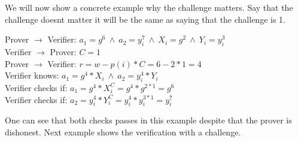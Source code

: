 \noindent
{} We will now show a concrete example why the challenge matters. Say that the challenge doesnt matter it will be the same as saying that the challenge is 1. 

\begin{infobox}
Prover \begin{math}\rightarrow\end{math} Verifier: \begin{math}a_1=g^6 \ \land\ a_2=y_i^7 \ \land \ X_i=g^2 \ \land \ Y_i=y_i^3 \end{math}\\
Verifier \begin{math}\rightarrow\end{math} Prover: \begin{math}C=1 \end{math}\\
Prover \begin{math}\rightarrow\end{math} Verifier: \begin{math}r=w-p(i) * C = 6-2 * 1= 4\end{math}\\
Verifier knows:  \begin{math}a_1=g^4 * X_i \ \land \ a_2=y_i^4 * Y_i \end{math}\\
Verifier checks if:  \begin{math}a_1 = g^4*X_i^C = g^4*g^{2*1} = g^6\end{math}\\
Verifier checks if:  \begin{math} a_2=y_i^4 * Y_i^C = y_i^4 * y_i^{3*1}= y_i^7 \end{math}
\end{infobox}

\noindent
One can see that both checks passes in this example despite that the prover is dishonest. Next example shows the verification with a challenge.

